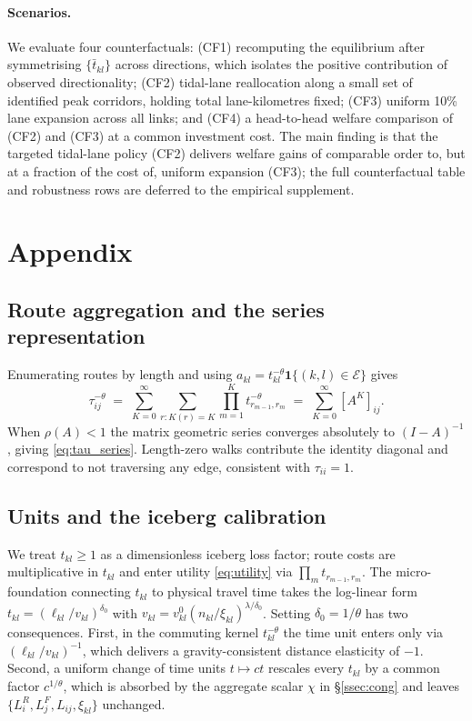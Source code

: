 \documentclass[12pt]{article}
\newcommand{\E}{\mathcal E}
\newcommand{\tbar}{\bar t}
\newcommand{\tkl}{t_{kl}}
\newcommand{\tijk}{\tau_{ij}}
\begin{document}
\paragraph{Scenarios.}
We evaluate four counterfactuals:
(CF1) recomputing the equilibrium after symmetrising
$\{\tbar_{kl}\}$ across directions, which isolates the positive
contribution of observed directionality;
(CF2) tidal-lane reallocation along a small set of identified peak
corridors, holding total lane-kilometres fixed;
(CF3) uniform 10\% lane expansion across all links; and
(CF4) a head-to-head welfare comparison of (CF2) and (CF3) at a
common investment cost.  The main finding is that the targeted
tidal-lane policy (CF2) delivers welfare gains of comparable order
to, but at a fraction of the cost of, uniform expansion (CF3); the
full counterfactual table and robustness rows are deferred to the
empirical supplement.

\appendix
\section*{Appendix}
\renewcommand{\thesubsection}{\Alph{subsection}}
\setcounter{subsection}{0}

\subsection{Route aggregation and the series representation}\label{app:tau}

Enumerating routes by length and using
$a_{kl}=\tkl^{-\theta}\mathbf 1\{(k,l)\in\E\}$ gives
\[
  \tijk^{-\theta}
  \;=\;\sum_{K=0}^{\infty}\sum_{r:K(r)=K}\prod_{m=1}^{K}t_{r_{m-1},r_m}^{-\theta}
  \;=\;\sum_{K=0}^{\infty}[A^K]_{ij}.
\]
When $\rho(A)<1$ the matrix geometric series converges absolutely to
$(I-A)^{-1}$, giving \eqref{eq:tau_series}.  Length-zero walks
contribute the identity diagonal and correspond to not traversing any
edge, consistent with $\tau_{ii}=1$.

\subsection{Units and the iceberg calibration}\label{app:units}

We treat $\tkl\ge 1$ as a dimensionless iceberg loss factor; route
costs are multiplicative in $\tkl$ and enter utility
\eqref{eq:utility} via $\prod_m t_{r_{m-1},r_m}$.  The micro-foundation
connecting $\tkl$ to physical travel time takes the log-linear form
$\tkl=(\ell_{kl}/v_{kl})^{\delta_0}$ with
$v_{kl}=v^{0}_{kl}(n_{kl}/\xi_{kl})^{\lambda/\delta_0}$.  Setting
$\delta_0=1/\theta$ has two consequences.  First, in the commuting
kernel $\tkl^{-\theta}$ the time unit enters only via
$(\ell_{kl}/v_{kl})^{-1}$, which delivers a gravity-consistent
distance elasticity of $-1$.  Second, a uniform change of time units
$t\mapsto ct$ rescales every $\tkl$ by a common factor $c^{1/\theta}$,
which is absorbed by the aggregate scalar $\chi$ in \S\ref{ssec:cong}
and leaves $\{L_i^R,L_j^F,L_{ij},\xi_{kl}\}$ unchanged.
\end{document}
